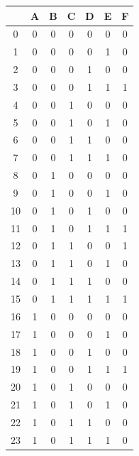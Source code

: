 \documentclass[12pt, oneside, openany]{article}
\begin{document}
{    \begin{table}[h!]
        \centering
        \sffamily
        \begin{tabular}{|c|c|c|c|c|c|c|}
            \hline
            & A & B & C & D & E & F\\
            \hline
            0  & 0 & 0 & 0 & 0 & 0 & 0\\
            \hline
            1  & 0 & 0 & 0 & 0 & 1 & 0\\
            \hline
            2  & 0 & 0 & 0 & 1 & 0 & 0\\
            \hline
            3  & 0 & 0 & 0 & 1 & 1 & 1\\
            \hline
            4  & 0 & 0 & 1 & 0 & 0 & 0\\
            \hline
            5  & 0 & 0 & 1 & 0 & 1 & 0\\
            \hline
            6  & 0 & 0 & 1 & 1 & 0 & 0\\
            \hline
            7  & 0 & 0 & 1 & 1 & 1 & 0\\
            \hline
            8  & 0 & 1 & 0 & 0 & 0 & 0\\
            \hline
            9  & 0 & 1 & 0 & 0 & 1 & 0\\
            \hline
            10 & 0 & 1 & 0 & 1 & 0 & 0\\
            \hline
            11 & 0 & 1 & 0 & 1 & 1 & 1\\
            \hline
            12 & 0 & 1 & 1 & 0 & 0 & 1\\
            \hline
            13 & 0 & 1 & 1 & 0 & 1 & 0\\
            \hline
            14 & 0 & 1 & 1 & 1 & 0 & 0\\
            \hline
            15 & 0 & 1 & 1 & 1 & 1 & 1\\
            \hline
            16 & 1 & 0 & 0 & 0 & 0 & 0\\
            \hline
            17 & 1 & 0 & 0 & 0 & 1 & 0\\
            \hline
            18 & 1 & 0 & 0 & 1 & 0 & 0\\
            \hline
            19 & 1 & 0 & 0 & 1 & 1 & 1\\
            \hline
            20 & 1 & 0 & 1 & 0 & 0 & 0\\
            \hline
            21 & 1 & 0 & 1 & 0 & 1 & 0\\
            \hline
            22 & 1 & 0 & 1 & 1 & 0 & 0\\
            \hline
            23 & 1 & 0 & 1 & 1 & 1 & 0\\

\end{tabular}
\end{table}}
\end{document}

